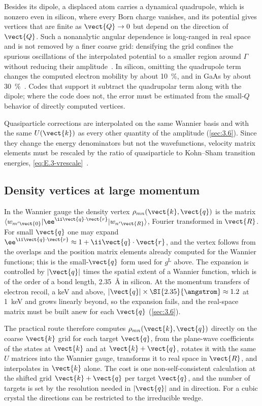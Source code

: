 Besides its dipole, a displaced atom carries a dynamical quadrupole, which is nonzero even in silicon, where every Born charge vanishes, and its potential gives vertices that are finite as $\vect{Q}\to 0$ but depend on the direction of $\vect{Q}$. Such a nonanalytic angular dependence is long-ranged in real space and is not removed by a finer coarse grid: densifying the grid confines the spurious oscillations of the interpolated potential to a smaller region around $\Gamma$ without reducing their amplitude~\cite{brunin2020electron}. In silicon, omitting the quadrupole term changes the computed electron mobility by about \SI{10}{\percent}, and in GaAs by about \SI{30}{\percent}~\cite{brunin2020electron}. Codes that support it subtract the quadrupolar term along with the dipole; where the code does not, the error must be estimated from the small-$Q$ behavior of directly computed vertices.

Quasiparticle corrections are interpolated on the same Wannier basis and with the same $U(\vect{k})$ as every other quantity of the amplitude (\cref{sec:3.6}). Since they change the energy denominators but not the wavefunctions, velocity matrix elements must be rescaled by the ratio of quasiparticle to Kohn--Sham transition energies, \cref{eq:E.3-vrescale}~\cite{noffsinger2012phonon}.

\subsection{Density vertices at large momentum}

In the Wannier gauge the density vertex $\rho_{mn}(\vect{k},\vect{q})$ is the matrix $\langle w_{m'\vect{0}}|\ee^{\ii\vect{q}\cdot\vect{r}}|w_{n'\vect{R}}\rangle$, Fourier transformed in $\vect{R}$. For small $\vect{q}$ one may expand $\ee^{\ii\vect{q}\cdot\vect{r}} \approx 1 + \ii\vect{q}\cdot\vect{r}$, and the vertex follows from the overlaps and the position matrix elements already computed for the Wannier functions; this is the small-$\vect{q}$ form used for $g^{\mathrm{L}}$ above. The expansion is controlled by $|\vect{q}|$ times the spatial extent of a Wannier function, which is of the order of a bond length, \SI{2.35}{\angstrom} in silicon. At the momentum transfers of electron recoil, a keV and above, $|\vect{q}|\times\SI{2.35}{\angstrom} \approx 1.2$ at \SI{1}{keV} and grows linearly beyond, so the expansion fails, and the real-space matrix must be built anew for each $\vect{q}$ (\cref{sec:3.6}).

The practical route therefore computes $\rho_{mn}(\vect{k},\vect{q})$ directly on the coarse $\vect{k}$ grid for each target $\vect{q}$, from the plane-wave coefficients of the states at $\vect{k}$ and at $\vect{k}+\vect{q}$, rotates it with the same $U$ matrices into the Wannier gauge, transforms it to real space in $\vect{R}$, and interpolates in $\vect{k}$ alone. The cost is one non-self-consistent calculation at the shifted grid $\vect{k}+\vect{q}$ per target $\vect{q}$, and the number of targets is set by the resolution needed in $|\vect{q}|$ and in direction. For a cubic crystal the directions can be restricted to the irreducible wedge.

